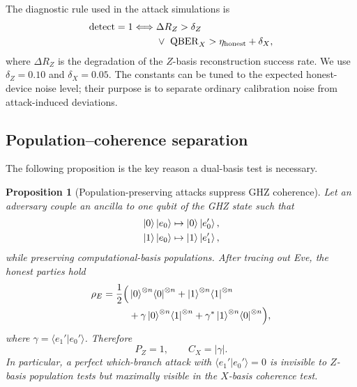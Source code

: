 \documentclass[aip,amsmath,amssymb,reprint,longbibliography]{revtex4-2}
\newtheorem{proposition}{Proposition}
\newcommand{\qber}{\mathrm{QBER}}
\newcommand{\ketzero}{\ket{0}^{\otimes n}}
\newcommand{\ketone}{\ket{1}^{\otimes n}}
\newcommand{\brazero}{\bra{0}^{\otimes n}}
\newcommand{\braone}{\bra{1}^{\otimes n}}
\begin{document}
The diagnostic rule used in the attack simulations is
\begin{equation}
\begin{aligned}
\mathrm{detect}=1
\Longleftrightarrow{}&
\Delta R_Z>\delta_Z\\
&{}\lor\ \qber_X>\eta_{\rm honest}+\delta_X ,
\end{aligned}
\label{eq:detection_rule}
\end{equation}
where $\Delta R_Z$ is the degradation of the $Z$-basis reconstruction success rate.  We use $\delta_Z=0.10$ and $\delta_X=0.05$.  The constants can be tuned to the expected honest-device noise level; their purpose is to separate ordinary calibration noise from attack-induced deviations.

\subsection{Population--coherence separation}
\label{subsec:population_coherence}

The following proposition is the key reason a dual-basis test is necessary.

\begin{proposition}[Population-preserving attacks suppress GHZ coherence]
\label{prop:coherence_suppression}
Let an adversary couple an ancilla to one qubit of the GHZ state such that
\begin{equation}
\begin{aligned}
\ket{0}\ket{e_0}&\mapsto\ket{0}\ket{e_0'},\\
\ket{1}\ket{e_0}&\mapsto\ket{1}\ket{e_1'} ,
\end{aligned}
\label{eq:which_branch_attack}
\end{equation}
while preserving computational-basis populations.  After tracing out Eve, the honest parties hold
\begin{equation}
\begin{aligned}
\rho_E=\frac{1}{2}\Bigl(&\ketzero\!\brazero+\ketone\!\braone\\
&+\gamma\ketzero\!\braone+\gamma^*\ketone\!\brazero\Bigr),
\end{aligned}
\label{eq:rho_eve}
\end{equation}
where $\gamma=\langle e_1'|e_0'\rangle$.  Therefore
\begin{equation}
P_Z=1,
\qquad
C_X=|\gamma|.
\label{eq:pz_cx_gamma}
\end{equation}
In particular, a perfect which-branch attack with $\langle e_1'|e_0'\rangle=0$ is invisible to $Z$-basis population tests but maximally visible in the $X$-basis coherence test.
\end{proposition}
\end{document}
